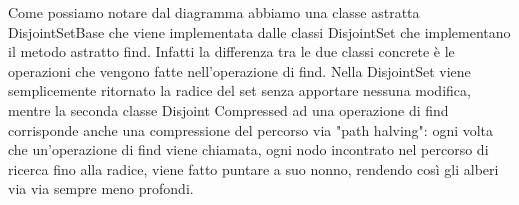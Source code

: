 Come possiamo notare dal diagramma abbiamo una classe astratta DisjointSetBase che viene implementata dalle classi DisjointSet che implementano il metodo astratto find. Infatti la differenza tra le due classi concrete è le operazioni che vengono fatte nell'operazione di find. Nella DisjointSet viene semplicemente ritornato la radice del set senza apportare nessuna modifica, mentre la seconda classe Disjoint Compressed ad una operazione di find corrisponde anche una compressione del percorso via "path halving": ogni volta che un'operazione di find viene chiamata, ogni nodo incontrato nel percorso di ricerca fino alla radice, viene fatto puntare a suo nonno, rendendo così gli alberi via via sempre meno profondi.


